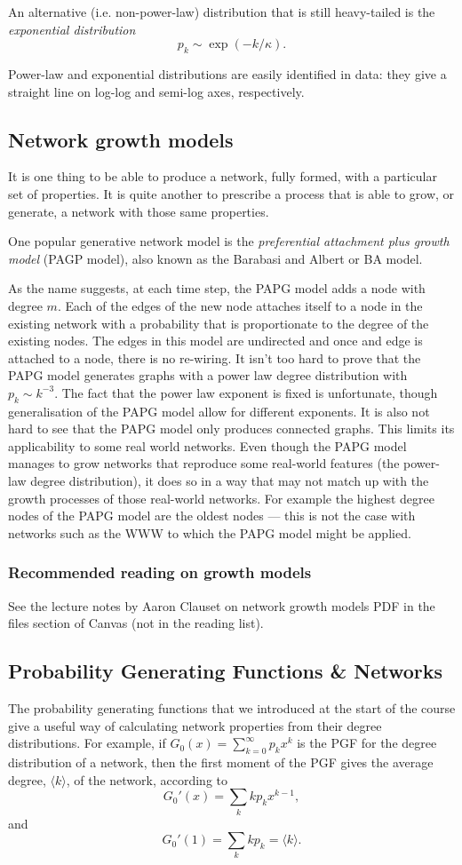 An alternative (i.e. non-power-law) distribution that is still heavy-tailed is the \emph{exponential distribution}
$$
	p_k\sim\exp(-k/\kappa).
$$

Power-law and exponential distributions are easily identified in data: they give a straight line on log-log and semi-log axes, respectively.

\subsection{Network growth models}
It is one thing to be able to produce a network, fully formed, with a particular set of properties. It is quite another to prescribe a process that is able to grow, or generate, a network with those same properties.

One popular generative network model is the \emph{preferential attachment plus growth model} (PAGP model), also known as the Barabasi and Albert or BA model.

As the name suggests, at each time step, the PAPG model adds a node with degree $m$. Each of the edges of the new node attaches itself to a node in the existing network with a probability that is proportionate to the degree of the existing nodes. The edges in this model are undirected and once and edge is attached to a node, there is no re-wiring. It isn't too hard to prove that the PAPG model generates graphs with a power law degree distribution with $p_k \sim k^{-3}$. The fact that the power law exponent is fixed is unfortunate, though generalisation of the PAPG model allow for different exponents. It is also not hard to see that the PAPG model only produces connected graphs. This limits its applicability to some real world networks. Even though the PAPG model manages to grow networks that reproduce some real-world features (the power-law degree distribution), it does so in a way that may not match up with the growth processes of those real-world networks. For example the highest degree nodes of the PAPG model are the oldest nodes --- this is not the case with networks such as the WWW to which the PAPG model might be applied.

\subsubsection{Recommended reading on growth models}
See the lecture notes by Aaron Clauset on network growth models PDF in the files section of Canvas (not in the reading list).

\subsection{Probability Generating Functions \& Networks}
The probability generating functions that we introduced at the start of the course give a useful way of calculating network properties from their degree distributions. For example, if $G_0(x) = \sum_{k=0}^\infty p_kx^k$ is the PGF for the degree distribution of a network, then the first moment of the PGF gives the average degree, $\langle k \rangle$, of the network, according to
$$
	G_{0}'(x) = \sum_{k}kp_{k}x^{k-1},
$$
and
$$
	G_{0}'(1) = \sum_{k}kp_{k} = \langle k \rangle.
$$	


